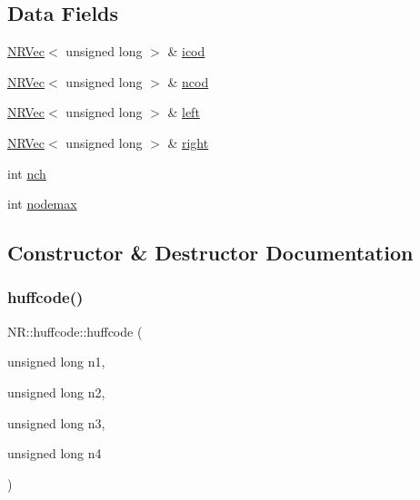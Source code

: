\subsection*{Data Fields}
\begin{DoxyCompactItemize}
\item 
\mbox{\hyperlink{classNR_1_1NRVec}{N\+R\+Vec}}$<$ unsigned long $>$ \& \mbox{\hyperlink{classNR_1_1huffcode_ad0de07752f40849b79f1e8ba6a23599d}{icod}}
\item 
\mbox{\hyperlink{classNR_1_1NRVec}{N\+R\+Vec}}$<$ unsigned long $>$ \& \mbox{\hyperlink{classNR_1_1huffcode_ab14fb00caae8be1a44a6d6605f18a02d}{ncod}}
\item 
\mbox{\hyperlink{classNR_1_1NRVec}{N\+R\+Vec}}$<$ unsigned long $>$ \& \mbox{\hyperlink{classNR_1_1huffcode_ad2aaf6e4e3d2b91875ced865d3c1662e}{left}}
\item 
\mbox{\hyperlink{classNR_1_1NRVec}{N\+R\+Vec}}$<$ unsigned long $>$ \& \mbox{\hyperlink{classNR_1_1huffcode_ac4dba36044a7dc9a52678f850fbc2a8c}{right}}
\item 
int \mbox{\hyperlink{classNR_1_1huffcode_a9083384cfcc723a3ab528d4530378d56}{nch}}
\item 
int \mbox{\hyperlink{classNR_1_1huffcode_aef596001bc067014b5c9dc4273f33252}{nodemax}}
\end{DoxyCompactItemize}


\subsection{Constructor \& Destructor Documentation}
\mbox{\label{classNR_1_1huffcode_adf21f7c173d14b46a90ca8295cfc61fd}} 
\subsubsection{\texorpdfstring{huffcode()}{huffcode()}\hspace{0.1cm}{\footnotesize\ttfamily [1/2]}}
{\footnotesize\ttfamily N\+R\+::huffcode\+::huffcode (\begin{DoxyParamCaption}\item[{unsigned long}]{n1,  }\item[{unsigned long}]{n2,  }\item[{unsigned long}]{n3,  }\item[{unsigned long}]{n4 }\end{DoxyParamCaption})\hspace{0.3cm}{\ttfamily [inline]}}


